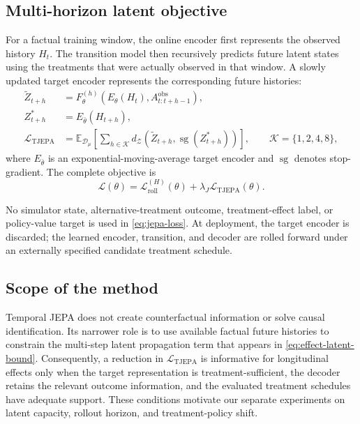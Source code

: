 \subsection{Multi-horizon latent objective}

For a factual training window, the online encoder first represents the
observed history $H_t$. The transition model then recursively predicts
future latent states using the treatments that were actually observed in
that window. A slowly updated target encoder represents the corresponding
future histories:
\begin{align}
    \widetilde Z_{t+h}
    &=F_\theta^{(h)}
      \!\left(E_\theta(H_t),A_{t:t+h-1}^{\mathrm{obs}}\right),
    \label{eq:jepa-prediction}\\
    Z^*_{t+h}
    &=E_{\bar\theta}(H_{t+h}),
    \label{eq:jepa-target}\\
    \mathcal L_{\mathrm{TJEPA}}
    &=\mathbb E_{\mathcal D_\mu}
      \left[
      \sum_{h\in\mathcal K}
      d_{\mathcal Z}\!\left(
          \widetilde Z_{t+h},
          \operatorname{sg}(Z^*_{t+h})
      \right)
      \right],
    \qquad \mathcal K=\{1,2,4,8\},
    \label{eq:jepa-loss}
\end{align}
where $E_{\bar\theta}$ is an exponential-moving-average target encoder
and $\operatorname{sg}$ denotes stop-gradient. The complete objective is
\begin{equation}
    \mathcal L(\theta)
    =\mathcal L_{\mathrm{roll}}^{(H)}(\theta)
     +\lambda_J\mathcal L_{\mathrm{TJEPA}}(\theta).
    \label{eq:complete-objective}
\end{equation}

No simulator state, alternative-treatment outcome, treatment-effect
label, or policy-value target is used in
\eqref{eq:jepa-loss}. At deployment, the target encoder is discarded;
the learned encoder, transition, and decoder are rolled forward under an
externally specified candidate treatment schedule.

\subsection{Scope of the method}

Temporal JEPA does not create counterfactual information or solve causal
identification. Its narrower role is to use available factual future
histories to constrain the multi-step latent propagation term that
appears in \eqref{eq:effect-latent-bound}. Consequently, a reduction in
$\mathcal L_{\mathrm{TJEPA}}$ is informative for longitudinal effects
only when the target representation is treatment-sufficient, the
decoder retains the relevant outcome information, and the evaluated
treatment schedules have adequate support. These conditions motivate
our separate experiments on latent capacity, rollout horizon, and
treatment-policy shift.
